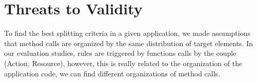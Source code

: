 \section{Threats to Validity} \label{sec:validity}
To find the best splitting criteria in a given application, we made assumptions that method calls are organized by the same distribution of target elements.
In our evaluation studies, rules are triggered by functions calls by the couple (Action, Resource), however, this is really related to the organization of the application code, we can find
different organizations of method calls.